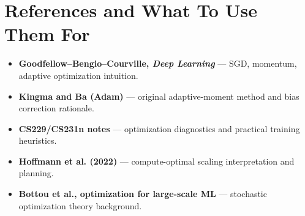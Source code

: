 \section*{References and What To Use Them For}
\begin{itemize}[leftmargin=1.5em]
  \item \textbf{Goodfellow--Bengio--Courville, \emph{Deep Learning}} --- SGD, momentum, adaptive optimization intuition.
  \item \textbf{Kingma and Ba (Adam)} --- original adaptive-moment method and bias correction rationale.
  \item \textbf{CS229/CS231n notes} --- optimization diagnostics and practical training heuristics.
  \item \textbf{Hoffmann et al. (2022)} --- compute-optimal scaling interpretation and planning.
  \item \textbf{Bottou et al., optimization for large-scale ML} --- stochastic optimization theory background.
\end{itemize}
